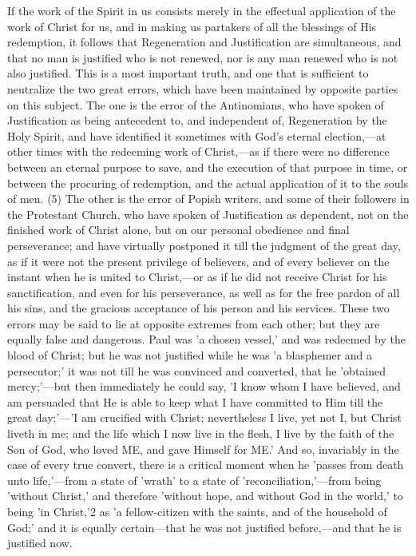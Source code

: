 \documentclass[
]{book}
\begin{document}
If the work of the Spirit in us consists merely in the effectual application of the work of Christ for us, and in making us partakers of all the blessings of His redemption, it follows that Regeneration and Justification are simultaneous, and that no man is justified who is not renewed, nor is any man renewed who is not also justified. This is a most important truth, and one that is sufficient to neutralize the two great errors, which have been maintained by opposite parties on this subject. The one is the error of the Antinomians, who have spoken of Justification as being antecedent to, and independent of, Regeneration by the Holy Spirit, and have identified it sometimes with God's eternal election,---at other times with the redeeming work of Christ,---as if there were no difference between an eternal purpose to save, and the execution of that purpose in time, or between the procuring of redemption, and the actual application of it to the souls of men. (5) The other is the error of Popish writers, and some of their followers in the Protestant Church, who have spoken of Justification as dependent, not on the finished work of Christ alone, but on our personal obedience and final perseverance; and have virtually postponed it till the judgment of the great day, as if it were not the present privilege of believers, and of every believer on the instant when he is united to Christ,---or as if he did not receive Christ for his sanctification, and even for his perseverance, as well as for the free pardon of all his sins, and the gracious acceptance of his person and his services. These two errors may be said to lie at opposite extremes from each other; but they are equally false and dangerous. Paul was 'a chosen vessel,' and was redeemed by the blood of Christ; but he was not justified while he was 'a blasphemer and a persecutor;' it was not till he was convinced and converted, that he 'obtained mercy;'---but then immediately he could say, 'I know whom I have believed, and am persuaded that He is able to keep what I have committed to Him till the great day;'---'I am crucified with Christ; nevertheless I live, yet not I, but Christ liveth in me; and the life which I now live in the flesh, I live by the faith of the Son of God, who loved ME, and gave Himself for ME.' And so, invariably in the case of every true convert, there is a critical moment when he 'passes from death unto life,'---from a state of 'wrath' to a state of 'reconciliation,'---from being 'without Christ,' and therefore 'without hope, and without God in the world,' to being 'in Christ,'2 as 'a fellow-citizen with the saints, and of the household of God;' and it is equally certain---that he was not justified before,---and that he is justified now.
\end{document}
